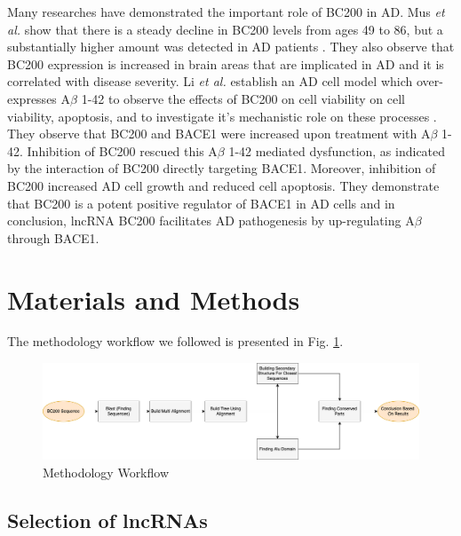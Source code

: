 \documentclass[conference, 11pt]{IEEEtran}
\begin{document}
Many researches have demonstrated the important role of BC200 in AD. 
Mus \emph{et al.} show that there is a steady decline in BC200 levels from ages 49 to 86, but a substantially higher amount was detected in AD patients \cite{mus2007dendritic}. 
They also observe that BC200 expression is increased in brain areas that are implicated in AD and it is correlated with disease severity. 
Li \emph{et al.} establish an AD cell model which over-expresses A$\beta$ 1-42 to observe the effects of BC200 on cell viability on cell viability, apoptosis, and to investigate it's mechanistic role on these processes \cite{li2018identification}. 
They observe that BC200 and BACE1  were increased upon treatment with A$\beta$ 1-42. 
Inhibition of BC200 rescued this A$\beta$ 1-42 mediated dysfunction, as indicated by the interaction of BC200 directly targeting BACE1. 
Moreover, inhibition of BC200 increased AD cell growth and reduced cell apoptosis. 
They demonstrate that BC200 is a potent positive regulator of BACE1 in AD cells and in conclusion, lncRNA BC200 facilitates AD pathogenesis by up-regulating A$\beta$ through BACE1.  					 			 		 	 

\section{Materials and Methods}\label{sec:methods}

The methodology workflow we followed is presented in Fig. \ref{fig:methods}.

\begin{figure}[ht]
  \centering
  \includegraphics[width=\textwidth, keepaspectratio]{figs/workflow.png}
  \caption{Methodology Workflow}
  \label{fig:methods}
\end{figure}

\subsection{Selection of lncRNAs}\label{sec:lncRNA-selection}
\end{document}
